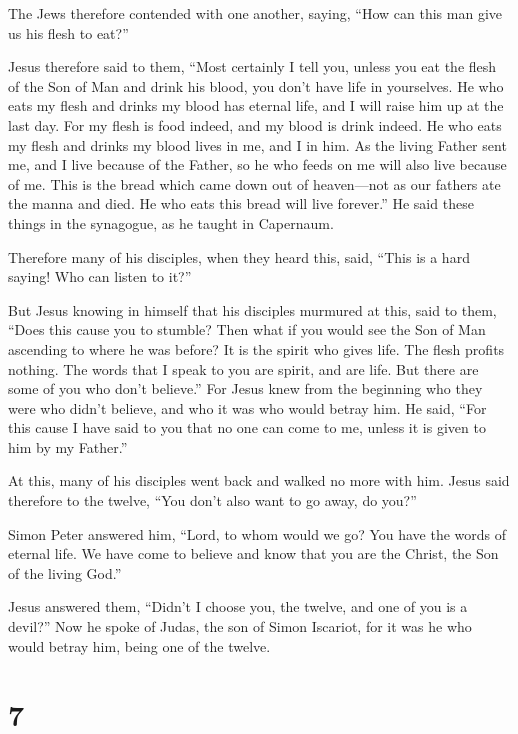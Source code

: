  The Jews therefore contended with one another, saying,
``How can this man give us his flesh to eat?''

 Jesus therefore said to them, ``Most certainly I tell you,
unless you eat the flesh of the Son of Man and drink his blood, you
don't have life in yourselves.  He who eats my flesh and
drinks my blood has eternal life, and I will raise him up at the last
day.  For my flesh is food indeed, and my blood is drink
indeed.  He who eats my flesh and drinks my blood lives in
me, and I in him.  As the living Father sent me, and I live
because of the Father, so he who feeds on me will also live because of
me.  This is the bread which came down out of heaven---not
as our fathers ate the manna and died. He who eats this bread will live
forever.''  He said these things in the synagogue, as he
taught in Capernaum.

 Therefore many of his disciples, when they heard this,
said, ``This is a hard saying! Who can listen to it?''

 But Jesus knowing in himself that his disciples murmured
at this, said to them, ``Does this cause you to stumble? 
Then what if you would see the Son of Man ascending to where he was
before?  It is the spirit who gives life. The flesh profits
nothing. The words that I speak to you are spirit, and are life.
 But there are some of you who don't believe.'' For Jesus
knew from the beginning who they were who didn't believe, and who it was
who would betray him.  He said, ``For this cause I have
said to you that no one can come to me, unless it is given to him by my
Father.''

 At this, many of his disciples went back and walked no
more with him.  Jesus said therefore to the twelve, ``You
don't also want to go away, do you?''

 Simon Peter answered him, ``Lord, to whom would we go? You
have the words of eternal life.  We have come to believe
and know that you are the Christ, the Son of the living God.''

 Jesus answered them, ``Didn't I choose you, the twelve,
and one of you is a devil?''  Now he spoke of Judas, the
son of Simon Iscariot, for it was he who would betray him, being one of
the twelve.

\hypertarget{section-6}{%
\section{7}\label{section-6}}

